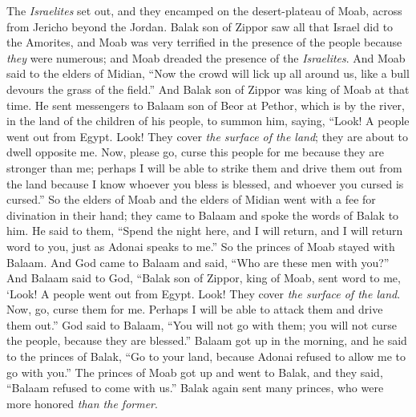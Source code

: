 \begin{biblechapter} %
 The \textit{Israelites} set out, and they encamped on the desert-plateau of Moab, across from Jericho beyond the Jordan.
\verse Balak son of Zippor saw all that Israel did to the Amorites,
\verse and Moab was very terrified in the presence of the people because \textit{they} were numerous; and Moab dreaded the presence of the \textit{Israelites}.
\verse And Moab said to the elders of Midian, “Now the crowd will lick up all around us, like a bull devours the grass of the field.” And Balak son of Zippor was king of Moab at that time.
\verse He sent messengers to Balaam son of Beor at Pethor, which is by the river, in the land of the children of his people, to summon him, saying, “Look! A people went out from Egypt. Look! They cover \textit{the surface of the land}; they are about to dwell opposite me.
\verse Now, please go, curse this people for me because they are stronger than me; perhaps I will be able to strike them and drive them out from the land because I know whoever you bless is blessed, and whoever you cursed is cursed.”
\verse So the elders of Moab and the elders of Midian went with a fee for divination in their hand; they came to Balaam and spoke the words of Balak to him.
\verse He said to them, “Spend the night here, and I will return, and I will return word to you, just as Adonai speaks to me.” So the princes of Moab stayed with Balaam.
\verse And God came to Balaam and said, “Who are these men with you?”
\verse And Balaam said to God, “Balak son of Zippor, king of Moab, sent word to me,
\verse ‘Look! A people went out from Egypt. Look! They cover \textit{the surface of the land}. Now, go, curse them for me. Perhaps I will be able to attack them and drive them out.”
\verse God said to Balaam, “You will not go with them; you will not curse the people, because they are blessed.”
\verse Balaam got up in the morning, and he said to the princes of Balak, “Go to your land, because Adonai refused to allow me to go with you.”
\verse The princes of Moab got up and went to Balak, and they said, “Balaam refused to come with us.”
\verse Balak again sent many princes, who were more honored \textit{than the former}.

\end{biblechapter}
